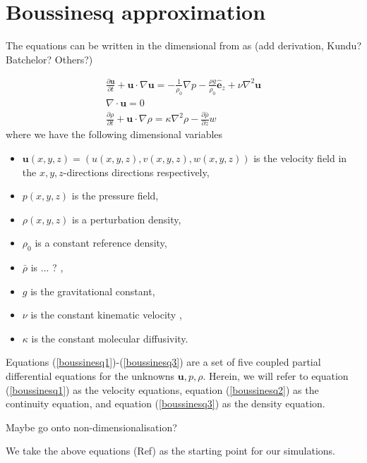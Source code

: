 \documentclass[letterpaper,12pt,titlepage,oneside,final]{book}
\begin{document}
\section{Boussinesq approximation}

The equations can be written in the dimensional from as (add derivation, Kundu? Batchelor? Others?)

\begin{align}
\frac{\partial \bm{u}}{\partial t} + \bm{u}\cdot \nabla \bm{u} = -\frac{1}{\rho_{0}}\nabla p - \frac{\rho g}{\rho_{0}}\hat{\bm{e}}_{z} + \nu \nabla^{2}\bm{u} \label{boussinesq1}\\
\nabla \cdot \bm{u} =0 \label{boussinesq2}\\
\frac{\partial \rho}{\partial t} + \bm{u}\cdot \nabla \rho = \kappa \nabla^{2}\rho - \frac{\partial \bar{\rho}}{\partial z} w\label{boussinesq3}
\end{align}
where we have the following dimensional variables
\begin{itemize}
\item $\textbf{u}(x,y,z)=(u(x,y,z),v(x,y,z),w(x,y,z))$ is the velocity field in the $x,y,z$-directions directions respectively,
\item $p(x,y,z)$ is the pressure field,
\item $\rho(x,y,z)$ is a perturbation density,
\item $\rho_{0}$ is a constant reference density,
\item $\bar{\rho}$ is ... ? ,
\item $g$ is the gravitational constant,
\item $\nu$ is the constant kinematic velocity ,
\item $\kappa$ is the constant molecular diffusivity.
\end{itemize}
Equations (\ref{boussinesq1})-(\ref{boussinesq3}) are a set of five coupled partial differential equations for the unknowns $\textbf{u},p,\rho$. Herein, we will refer to equation (\ref{boussinesq1}) as the velocity equations, equation (\ref{boussinesq2}) as the continuity equation, and equation (\ref{boussinesq3}) as the density equation. 

Maybe go onto non-dimensionalisation? 

We take the above equations (Ref) as the starting point for our simulations. 


%
%
\end{document}
